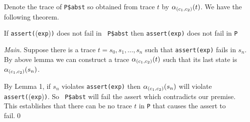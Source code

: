 Denote the trace of {\tt P\$abst} so obtained from trace \(t\) by
\(\alpha_{(c_1,c_2)}(t)\). We have the following theorem.
  

\begin{theorem}[Main]\label{main}
 
If {\tt assert(}\tr({\tt exp}){\tt)} does not fail in {\tt
  P\$abst} then {\tt assert(exp)} does not fail in {\tt P}
  
\end{theorem}



\begin{proof}[Main]

  Suppose there is a trace \(t = s_0, s_1,...,s_n\) such
that {\tt assert(exp)} fails in \(s_n\). By above lemma we can construct a trace \(\alpha_{(c_1,c_2)}(t)\)
such that its last state is \(\alpha_{(c_1,c_2)}(s_n)\).
  
By Lemma 1, if \(s_n\) violates {\tt assert(exp)} then
\(\alpha_{(c_1,c_2)}(s_n)\) will violate\\ {\tt assert(}\tr({\tt exp}){\tt)}. So {\tt
  P\$abst} will fail the assert which contradicts our premise. This
establishes that there can be no trace \(t\) in {\tt P} that causes
the assert to fail.\qed

\end{proof}

